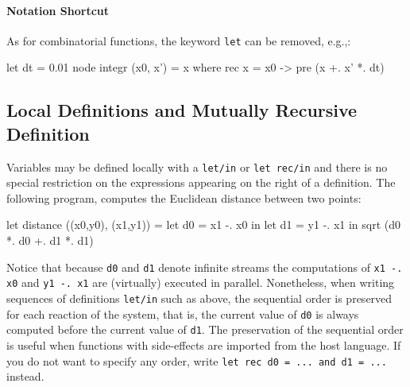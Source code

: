 \documentclass[11pt,titlepage,twoside]{report}
\begin{document}
\paragraph{Notation Shortcut} As for combinatorial functions,
the keyword \texttt{let} can be removed, e.g.,:

\begin{runverbatim}[withresult,label=integr]
let dt = 0.01
node integr (x0, x') = x where
  rec x = x0 -> pre (x +. x' *. dt)
\end{runverbatim}




\subsection{Local Definitions and Mutually Recursive Definition}
\label{sec:local-defin-mutu}
Variables may be defined locally with a \verb-let/in- or
\verb-let rec/in- and there is no special restriction on the
expressions appearing on the right of a definition. The following
program, computes the Euclidean distance between two points:

\begin{runverbatim}
let distance ((x0,y0), (x1,y1)) =
  let d0 = x1 -. x0 in
  let d1 = y1 -. x1 in
  sqrt (d0 *. d0 +. d1 *. d1)
\end{runverbatim}
Notice that because \verb-d0- and \verb-d1- denote infinite streams
the computations of \verb+x1 -. x0+ and \verb+y1 -. x1+ are
(virtually) executed in parallel.  Nonetheless, when writing sequences
of definitions \verb-let/in- such as above, the sequential order is
preserved for each reaction of the system, that is, the current value
of \verb-d0- is always computed before the current value of
\verb-d1-. The preservation of the sequential order is useful when functions
with side-effects are imported from the host language. If you do not want to
specify any order, write \texttt{let rec d0 = ... and d1 = ...} instead.
\end{document}
